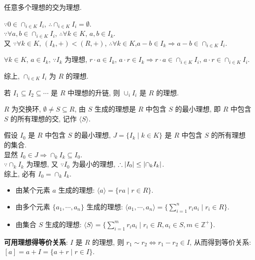 \documentclass{note}
\begin{document}
\begin{thm}
    任意多个理想的交为理想.
\end{thm}
\begin{pf}
    $\because 0\in\cap_{i\in K}I_i$, $\therefore\cap_{i\in K}I_i=\emptyset$.\\
    $\because\forall a,b\in\cap_{i\in K}I_i$, $\therefore\forall k\in K$, $a,b\in I_k$.\\
    又 $\because\forall k\in K$, $(I_k,+)<(R,+)$, $\therefore\forall k\in K$,$a-b\in I_k\Longrightarrow a-b\in\cap_{i\in K}I_i$.

    $\forall k\in K$, $a\in I_k$, $\because I_k$ 为理想, $r\cdot a\in I_k$, $a\cdot r\in I_k\Longrightarrow r\cdot a\in\cap_{i\in K}I_i$, $a\cdot r\in\cap_{i\in K}I_i$.

    综上, $\cap_{i\in K}I_i$ 为 $R$ 的理想.
\end{pf}

\begin{thm}
    若 $I_1\subseteq I_2\subseteq\cdots$ 是 $R$ 中理想的升链, 则 $\cup_iI_i$ 是 $R$ 的理想.
\end{thm}

\begin{df}[生成理想]
    $R$ 为交换环, $\emptyset\neq S\subseteq R$, 由 $S$ 生成的理想是 $R$ 中包含 $S$ 的最小理想, 即 $R$ 中包含 $S$ 的所有理想的交, 记作 $\langle S\rangle$.
\end{df}
\begin{pf}
    假设 $I_0$ 是 $R$ 中包含 $S$ 的最小理想, $J=\{I_k\mid k\in K\}$ 是 $R$ 中包含 $S$ 的所有理想的集合.\\
    显然 $I_0\in J\Longrightarrow\cap_kI_k\subseteq I_0$.\\
    $\because\cap_kI_k$ 为理想, 又 $\because I_0$ 为最小的理想, $\therefore\left\lvert I_0\right\rvert\leq\left\lvert\cap_kI_k\right\rvert$.\\
    综上, 必有 $I_0=\cap_kI_k$.
\end{pf}

\begin{itemize}
    \item 由某个元素 $a$ 生成的理想: $\langle a\rangle=\{ra\mid r\in R\}$.
    \item 由多个元素 $\{a_1,\cdots,a_n\}$ 生成的理想: $\langle a_1,\cdots,a_n\rangle=\{\sum_{i=1}^nr_ia_i\mid r_i\in R\}$.
    \item 由集合 $S$ 生成的理想: $\langle S\rangle=\{\sum_{i=1}^mr_ia_i\mid r_i\in R,a_i\in S,m\in\mathbb{Z}^+\}$.
\end{itemize}

\textbf{可用理想得等价关系}: $I$ 是 $R$ 的理想, 则 $r_1\sim r_2\Longleftrightarrow r_1-r_2\in I$, 从而得到等价关系: $[a]=a+I=\{a+r\mid r\in I\}$.
\end{document}

